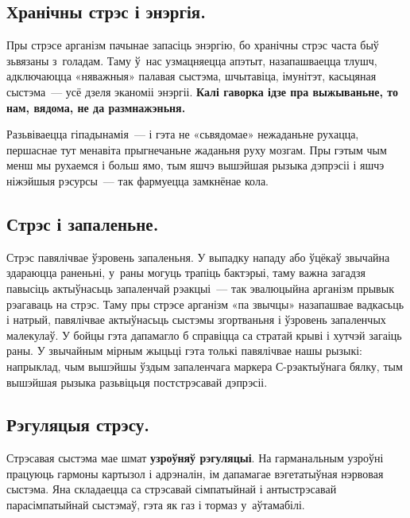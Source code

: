 \subsection*{Хранічны стрэс і энэргія.}

Пры стрэсе арганізм пачынае запасіць энэргію, бо хранічны стрэс часта быў зьвязаны з~голадам. Таму ў~нас узмацняецца апэтыт, назапашваецца тлушч, адключаюцца «няважныя» палавая сыстэма, шчытавіца, імунітэт, касьцяная сыстэма~--- усё дзеля эканоміі энэргіі. \textbf{Калі гаворка ідзе пра выжываньне, то нам, вядома, не да размнажэньня.}

Разьвіваецца гіпадынамія~--- і гэта не «сьвядомае» нежаданьне рухацца, першаснае тут менавіта прыгнечаньне жаданьня руху мозгам. Пры гэтым чым менш мы рухаемся і больш ямо, тым яшчэ вышэйшая рызыка дэпрэсіі і яшчэ ніжэйшыя рэсурсы~--- так фармуецца замкнёнае кола.

\subsection*{Стрэс і запаленьне.}

Стрэс павялічвае ўзровень запаленьня. У выпадку нападу або ўцёкаў звычайна здараюцца раненьні, у~раны могуць трапіць бактэрыі, таму важна загадзя павысіць актыўнасьць запаленчай рэакцыі~--- так эвалюцыйна арганізм прывык рэагаваць на стрэс. Таму пры стрэсе арганізм «па звычцы» назапашвае вадкасьць і натрый, павялічвае актыўнасьць сыстэмы згортваньня і ўзровень запаленчых малекулаў. У бойцы гэта дапамагло б справіцца са стратай крыві і хутчэй загаіць раны. У звычайным мірным жыцьці гэта толькі павялічвае нашы рызыкі: напрыклад, чым вышэйшы ўздым запаленчага маркера С-рэактыўнага бялку, тым вышэйшая рызыка разьвіцьця постстрэсавай дэпрэсіі.

\subsection*{Рэгуляцыя стрэсу.}

Стрэсавая сыстэма мае шмат \textbf{узроўняў рэгуляцыі}. На гарманальным узроўні працуюць гармоны картызол і адрэналін, ім дапамагае вэгетатыўная нэрвовая сыстэма. Яна складаецца са стрэсавай сімпатыйнай і антыстрэсавай парасімпатыйнай сыстэмаў, гэта як газ і тормаз у~аўтамабілі. 


